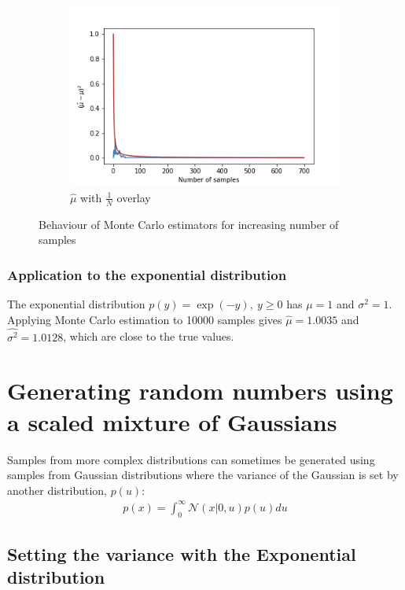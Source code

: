 \documentclass[a4paper]{article}
\begin{document}
\begin{figure}[h]
\begin{subfigure}[b]{0.3\textwidth}
        \includegraphics[width=\textwidth]{figures/monte_carlo_mean_best_fit.png}
        \caption{$\hat{\mu}$ with $\frac{1}{N}$ overlay}
        \label{fig:monte_carlo_mean_best_fit}
    \end{subfigure}
    \caption{Behaviour of Monte Carlo estimators for increasing number of samples}
    \label{fig:monte_carlo_convergence}
\end{figure}

\subsubsection{Application to the exponential distribution}
The exponential distribution $p(y) = \exp(-y), \ y \geq 0$ has $\mu = 1$ and $\sigma^2 = 1$.
Applying Monte Carlo estimation to 10000 samples gives $\hat{\mu} = 1.0035$ and $\hat{\sigma^2} = 1.0128$, which are
close to the true values.



\section{Generating random numbers using a scaled mixture of Gaussians}

Samples from more complex distributions can sometimes be generated using samples from Gaussian distributions
where the variance of the Gaussian is set by another distribution, $p(u)$:
\begin{align*}
    p(x) = \int_0^{\infty} \mathcal{N}(x | 0, u) p(u) du
\end{align*}

\subsection{Setting the variance with the Exponential distribution}
\end{document}
